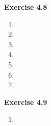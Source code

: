 \textbf{Exercise 4.8}
\begin{enumerate}
    \item 
    \item 
    \item 
    \item 
    \item 
    \item 
    \item 
\end{enumerate}

\textbf{Exercise 4.9}
\begin{enumerate}
    \item 
\end{enumerate}


